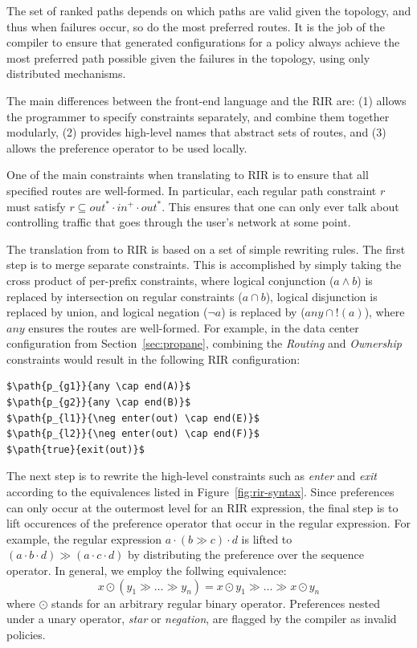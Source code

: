 The set of ranked paths depends on which paths are valid given the topology, and thus when failures occur, so do the most preferred routes. It is the job of the \sysname compiler to ensure that generated configurations for a policy always achieve the most preferred path possible given the failures in the topology, using only distributed mechanisms.



The main differences between the \sysname front-end language and the RIR are: (1) \sysname allows the programmer to specify constraints separately, and combine them together modularly, (2) \sysname provides high-level names that abstract sets of routes, and (3) \sysname allows the preference operator to be used locally.

One of the main constraints when translating to RIR is to ensure that all specified routes are well-formed. In particular, each regular path constraint $r$ must satisfy $r \subseteq out^* \cdot in^+ \cdot out^*$. This ensures that one can only ever talk about controlling traffic that goes through the user's network at some point.

The translation from \sysname to RIR is based on a set of simple rewriting rules.
The first step is to merge separate constraints. This is accomplished by simply taking the cross product of per-prefix constraints, where logical conjunction ($a \wedge b$) is replaced by intersection on regular constraints ($a \cap b$), logical disjunction is replaced by union, and logical negation ($\neg a$) is replaced by ($any \cap !(a)$), where $any$ ensures the routes are well-formed.
%
For example, in the data center configuration from Section~\ref{sec:propane}, combining the \textit{Routing} and \textit{Ownership} constraints would result in the following RIR configuration:

\begin{lstlisting}[mathescape=true]
$\path{p_{g1}}{any \cap end(A)}$
$\path{p_{g2}}{any \cap end(B)}$
$\path{p_{l1}}{\neg enter(out) \cap end(E)}$
$\path{p_{l2}}{\neg enter(out) \cap end(F)}$
$\path{true}{exit(out)}$
\end{lstlisting}

The next step is to rewrite the high-level constraints such as \textit{enter} and \textit{exit} according to the equivalences listed in Figure~\ref{fig:rir-syntax}. Since preferences can only occur at the outermost level for an RIR expression, the final step is to lift occurences of the preference operator that occur in the regular expression. For example, the regular expression $a \cdot (b \gg c) \cdot d$ is lifted to $(a \cdot b \cdot d) \gg (a \cdot c \cdot d)$ by distributing the preference over the sequence operator. In general, we employ the follwing equivalence:
%
$$x \odot (y_1 \gg \dots \gg y_n) = x \odot y_1 \gg \dots \gg x \odot y_n$$
%
where $\odot$ stands for an arbitrary regular binary operator. Preferences nested under a unary operator, \textit{star} or \textit{negation}, are flagged by the compiler as invalid policies.



